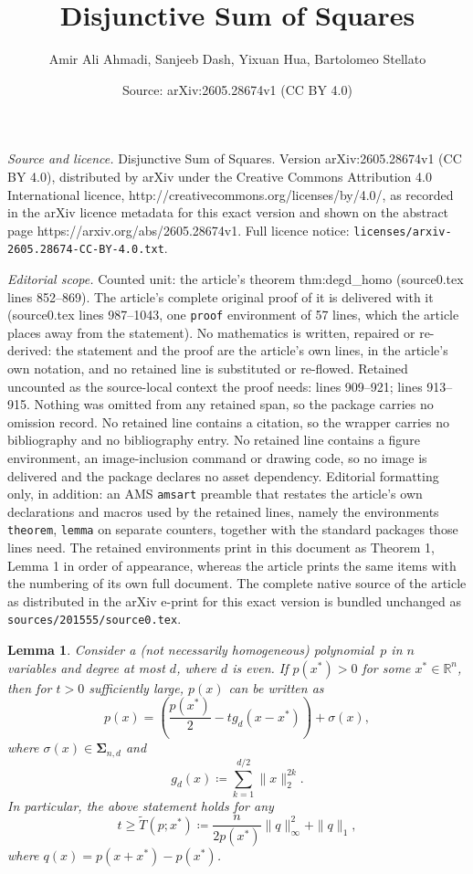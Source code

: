 \documentclass[10pt,a4paper]{amsart}
\title{Disjunctive Sum of Squares}
\author{Amir Ali Ahmadi, Sanjeeb Dash, Yixuan Hua, Bartolomeo Stellato}
\date{Source: arXiv:2605.28674v1 (CC BY 4.0)}
\newtheorem{lemma}{Lemma}
\newcommand{\SOS}{\mathbf{\Sigma}}
\newcommand{\defeq}{\coloneq}
\newcommand{\reals}{\mathbb{R}}
\begin{document}
\maketitle

\noindent\emph{Source and licence.} Disjunctive Sum of Squares. Version arXiv:2605.28674v1 (CC BY 4.0), distributed by arXiv under the Creative Commons Attribution 4.0 International licence, http://creativecommons.org/licenses/by/4.0/, as recorded in the arXiv licence metadata for this exact version and shown on the abstract page https://arxiv.org/abs/2605.28674v1. Full licence notice: \texttt{licenses/arxiv-2605.28674-CC-BY-4.0.txt}.\par\smallskip

\noindent\textit{Editorial scope.} Counted unit: the article's theorem thm:degd\_homo (source0.tex lines 852--869). The article's complete original proof of it is delivered with it (source0.tex lines 987--1043, one \texttt{proof} environment of 57 lines, which the article places away from the statement). No mathematics is written, repaired or re-derived: the statement and the proof are the article's own lines, in the article's own notation, and no retained line is substituted or re-flowed.  Retained uncounted as the source-local context the proof needs: lines 909--921; lines 913--915.  Nothing was omitted from any retained span, so the package carries no omission record.  No retained line contains a citation, so the wrapper carries no bibliography and no bibliography entry.  No retained line contains a figure environment, an image-inclusion command or drawing code, so no image is delivered and the package declares no asset dependency.  Editorial formatting only, in addition: an AMS \texttt{amsart} preamble that restates the article's own declarations and macros used by the retained lines, namely the environments \texttt{theorem}, \texttt{lemma} on separate counters, together with the standard packages those lines need.  The retained environments print in this document as Theorem 1, Lemma 1 in order of appearance, whereas the article prints the same items with the numbering of its own full document.  The complete native source of the article as distributed in the arXiv e-print for this exact version is bundled unchanged as \texttt{sources/201555/source0.tex}.
\begin{lemma}\label{thm:degd_nonhomo}
Consider a (not necessarily homogeneous) polynomial~$p$ in $n$ variables and degree at most $d$, where $d$ is even. If $p(x^*)>0$ for some $x^*\in\reals^n$, then for $t>0$ sufficiently large, $p(x)$ can be written as
\[p(x)=\left(\frac{p(x^*)}{2}-tg_d(x-x^*)\right)+\sigma(x),\]
where $\sigma(x)\in\SOS_{n,d}$ and 
\begin{equation}\label{eq:degd_nonhomo_g}
  g_d(x)\defeq\sum_{k=1}^{d/2}\|x\|_2^{2k}.  
\end{equation}
In particular, the above statement holds for any 
\[t\ge \tilde{T}(p;x^*)\defeq\dfrac{n}{2p(x^*)}\|q\|^2_{\infty} + \|q\|_1,\]
where $q(x)=p(x+x^*)-p(x^*)$. 
\end{lemma}
\end{document}
